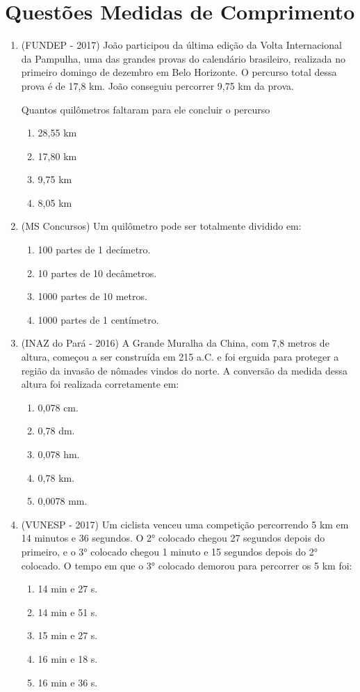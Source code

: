 \section{Questões Medidas de Comprimento}
\begin{enumerate}
 \item (FUNDEP - 2017) João participou da última edição da Volta Internacional da Pampulha, uma das grandes provas do calendário brasileiro, realizada no primeiro domingo de dezembro em Belo Horizonte. O percurso total dessa prova é de 17,8 km. João conseguiu percorrer 9,75 km da prova.

Quantos quilômetros faltaram para ele concluir o percurso
 \begin{enumerate}
 \item 28,55 km
 \item 17,80 km
 \item 9,75 km
 \item 8,05 km
\end{enumerate}

\item (MS Concursos) Um quilômetro pode ser totalmente dividido em:
\begin{enumerate}
 \item 100 partes de 1 decímetro.
 \item 10 partes de 10 decâmetros.
 \item 1000 partes de 10 metros.
 \item 1000 partes de 1 centímetro.
\end{enumerate}

\item (INAZ do Pará - 2016) A Grande Muralha da China, com 7,8 metros de altura, começou a ser construída em 215 a.C. e foi erguida para proteger a região da invasão de nômades vindos do norte. A conversão da medida dessa altura foi realizada corretamente em:
\begin{enumerate}
 \item 0,078 cm.
 \item 0,78 dm.
 \item 0,078 hm.
 \item 0,78 km.
 \item 0,0078 mm.
\end{enumerate}

\item (VUNESP - 2017) Um ciclista venceu uma competição percorrendo 5 km em 14 minutos e 36 segundos. O 2° colocado chegou 27 segundos depois do primeiro, e o 3° colocado chegou 1 minuto e 15 segundos depois do 2° colocado. O tempo em que o 3° colocado demorou para percorrer os 5 km foi:
\begin{enumerate}
 \item 14 min e 27 s.
 \item 14 min e 51 s.
 \item 15 min e 27 s.
 \item 16 min e 18 s.
 \item 16 min e 36 s.
\end{enumerate}


\end{enumerate}
